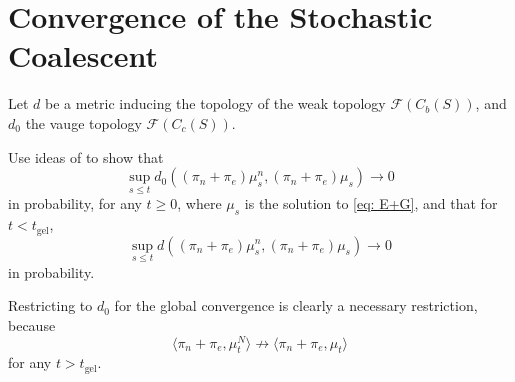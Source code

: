 \section{Convergence of the Stochastic Coalescent}
Let $d$ be a metric inducing the topology of the weak topology $\mathcal{F}(C_b(S))$, and $d_0$ the vauge topology $\mathcal{F}(C_c(S))$. 
\begin{lemma}\label{lemma: local uniform convergence of stochastic coagulent} Use ideas of \cite{N99} to show that \begin{equation}
   \sup_{s\leq t} d_0((\pi_n+\pi_e)\mu^n_s, (\pi_n+\pi_e)\mu_s) \rightarrow 0
\end{equation} in probability, for any $t\geq 0$, where $\mu_s$ is the solution to \ref{eq: E+G}, and that for $t<t_\text{gel}$, \begin{equation}
   \sup_{s\leq t} d((\pi_n+\pi_e)\mu^n_s,(\pi_n+\pi_e)\mu_s) \rightarrow 0
\end{equation} in probability.\end{lemma} Restricting to $d_0$ for the global convergence is clearly a necessary restriction, because\begin{equation}
    \langle \pi_n+\pi_e, \mu^N_t\rangle \not\rightarrow \langle \pi_n+\pi_e, \mu_t\rangle
\end{equation} for any $t>t_\text{gel}.$

